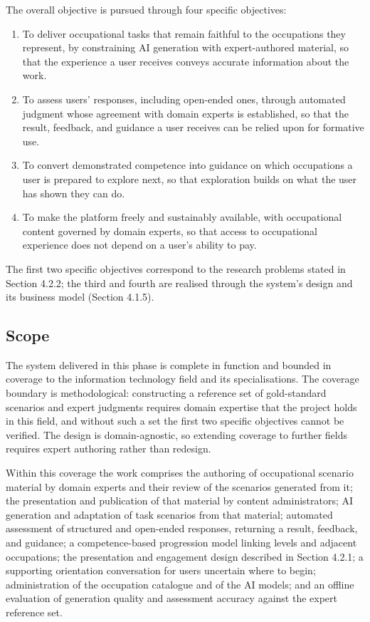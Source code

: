 The overall objective is pursued through four specific objectives:

\begin{enumerate}[leftmargin=1.5em]
  \item To deliver occupational tasks that remain faithful to the occupations they represent, by constraining AI generation with expert-authored material, so that the experience a user receives conveys accurate information about the work.
  \item To assess users' responses, including open-ended ones, through automated judgment whose agreement with domain experts is established, so that the result, feedback, and guidance a user receives can be relied upon for formative use.
  \item To convert demonstrated competence into guidance on which occupations a user is prepared to explore next, so that exploration builds on what the user has shown they can do.
  \item To make the platform freely and sustainably available, with occupational content governed by domain experts, so that access to occupational experience does not depend on a user's ability to pay.
\end{enumerate}

The first two specific objectives correspond to the research problems stated in Section 4.2.2; the third and fourth are realised through the system's design and its business model (Section 4.1.5).

\subsection{Scope}

The system delivered in this phase is complete in function and bounded in coverage to the information technology field and its specialisations. The coverage boundary is methodological: constructing a reference set of gold-standard scenarios and expert judgments requires domain expertise that the project holds in this field, and without such a set the first two specific objectives cannot be verified. The design is domain-agnostic, so extending coverage to further fields requires expert authoring rather than redesign.

Within this coverage the work comprises the authoring of occupational scenario material by domain experts and their review of the scenarios generated from it; the presentation and publication of that material by content administrators; AI generation and adaptation of task scenarios from that material; automated assessment of structured and open-ended responses, returning a result, feedback, and guidance; a competence-based progression model linking levels and adjacent occupations; the presentation and engagement design described in Section 4.2.1; a supporting orientation conversation for users uncertain where to begin; administration of the occupation catalogue and of the AI models; and an offline evaluation of generation quality and assessment accuracy against the expert reference set.

